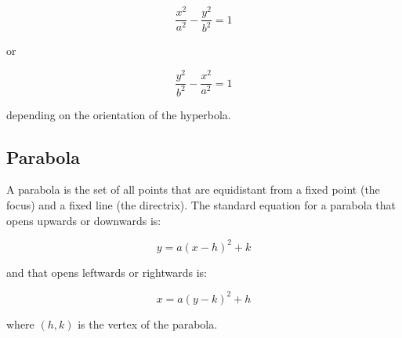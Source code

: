 \begin{equation}
\frac{x^2}{a^2} - \frac{y^2}{b^2} = 1
\end{equation}

or

\begin{equation}
\frac{y^2}{b^2} - \frac{x^2}{a^2} = 1
\end{equation}

depending on the orientation of the hyperbola.

\subsection{Parabola}

A parabola is the set of all points that are equidistant from a fixed point (the focus) and a fixed line (the directrix). The standard equation for a parabola that opens upwards or downwards is:

\begin{equation}
y = a(x - h)^2 + k
\end{equation}

and that opens leftwards or rightwards is:

\begin{equation}
x = a(y - k)^2 + h
\end{equation}

where $(h,k)$ is the vertex of the parabola.

\